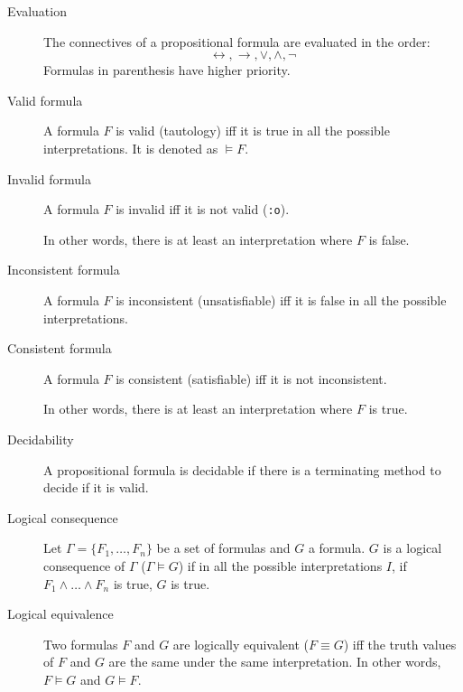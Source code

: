 \begin{description}
    \item[Evaluation] 
        The connectives of a propositional formula are evaluated in the order:
        \[ \leftrightarrow, \rightarrow, \vee, \land, \lnot \]
        Formulas in parenthesis have higher priority.

    \item[Valid formula] 
        A formula $F$ is valid (tautology) iff it is true in all the possible interpretations.
        It is denoted as $\models F$.

    \item[Invalid formula] 
        A formula $F$ is invalid iff it is not valid {\tiny(\texttt{:o})}.
        
        In other words, there is at least an interpretation where $F$ is false.

    \item[Inconsistent formula] 
        A formula $F$ is inconsistent (unsatisfiable) iff it is false in all the possible interpretations.
    
    \item[Consistent formula] 
        A formula $F$ is consistent (satisfiable) iff it is not inconsistent.

        In other words, there is at least an interpretation where $F$ is true.
    
    \item[Decidability] 
         A propositional formula is decidable if there is a terminating method to decide if it is valid.

    \item[Logical consequence]  
         Let $\Gamma = \{F_1, \dots, F_n\}$ be a set of formulas and $G$ a formula.
         $G$ is a logical consequence of $\Gamma$ ($\Gamma \models G$)
         if in all the possible interpretations $I$, 
         if $F_1 \land \dots \land F_n$ is true, $G$ is true.

    \item[Logical equivalence] 
        Two formulas $F$ and $G$ are logically equivalent ($F \equiv G$) iff the truth values of $F$ and $G$
        are the same under the same interpretation.
        In other words, $F \models G$ and $G \models F$.


\end{description}
